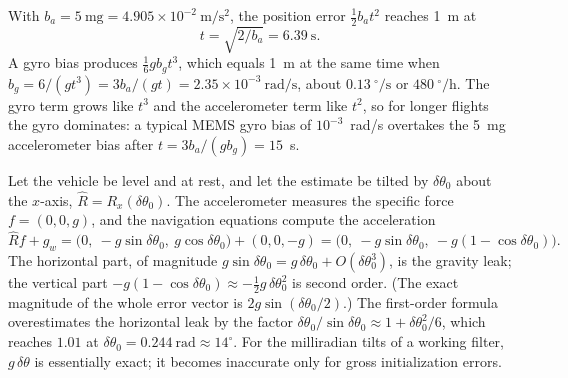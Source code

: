 \begin{solutions}
  \item With $b_a = 5~\mathrm{mg} = 4.905\times10^{-2}~\mathrm{m/s^2}$, the position error $\tfrac12b_at^2$ reaches 1~m at
        \[
          t = \sqrt{2/b_a} = 6.39~\mathrm{s}.
        \]
        A gyro bias produces $\tfrac16gb_gt^3$, which equals 1~m at the same time when
        $b_g = 6/(gt^3) = 3b_a/(gt) = 2.35\times10^{-3}~\mathrm{rad/s}$, about $0.13~^\circ/\mathrm{s}$ or $480~^\circ/\mathrm{h}$.
        The gyro term grows like $t^3$ and the accelerometer term like $t^2$, so for longer flights the gyro dominates: a
        typical MEMS gyro bias of $10^{-3}$~rad/s overtakes the 5~mg accelerometer bias after $t = 3b_a/(gb_g) = 15$~s.

  \item Let the vehicle be level and at rest, and let the estimate be tilted by $\delta\theta_0$ about the $x$-axis,
        $\hat R = R_x(\delta\theta_0)$. The accelerometer measures the specific force $f = (0, 0, g)$, and the navigation
        equations compute the acceleration
        \[
          \hat Rf + g_w = \big(0,\ -g\sin\delta\theta_0,\ g\cos\delta\theta_0\big) + (0, 0, -g)
          = \big(0,\ -g\sin\delta\theta_0,\ -g(1 - \cos\delta\theta_0)\big).
        \]
        The horizontal part, of magnitude $g\sin\delta\theta_0 = g\,\delta\theta_0 + O(\delta\theta_0^3)$, is the gravity leak; the
        vertical part $-g(1 - \cos\delta\theta_0) \approx -\tfrac12g\,\delta\theta_0^2$ is second order. (The exact magnitude of the
        whole error vector is $2g\sin(\delta\theta_0/2)$.) The first-order formula overestimates the horizontal leak by the
        factor $\delta\theta_0/\sin\delta\theta_0 \approx 1 + \delta\theta_0^2/6$, which reaches $1.01$ at
        $\delta\theta_0 = 0.244~\mathrm{rad} \approx 14^\circ$. For the milliradian tilts of a working filter, $g\,\delta\theta$ is
        essentially exact; it becomes inaccurate only for gross initialization errors.


\end{solutions}
